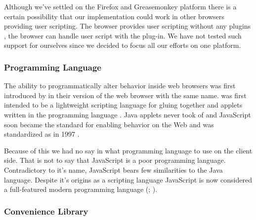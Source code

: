 Although we've settled on the Firefox and Greasemonkey platform there is a
certain possibility that our implementation could work in other browsers
providing user scripting. The  browser provides user scripting
without any plugins%
,
the  browser can handle user script with the
%
plug-in. We have not tested such support for ourselves since we decided to
focus all our efforts on one platform.

\subsubsection{Programming Language}

The ability to programmatically alter behavior inside web browsers was first
introduced by  in their  version of the web browser
with the same name.  was first intended to be a
lightweight scripting language for gluing together  and applets
written in the  programming language \citep{netscape95}. Java
applets never took of and JavaScript soon became the  standard
for enabling behavior on the Web and was standardized as
 in 1997 \citep{ecma99}.

Because of this we had no say in what programming language to use on the
client side. That is not to say that JavaScript is a poor programming
language. Contradictory to it's name, JavaScript bears few similarities to the
Java language.%
Despite it's origins as a scripting language JavaScript is now considered
a full-featured modern programming language
(\citealp[p.~2]{flanagan06};
\citealp[p.~3]{resig06}).


\subsubsection{Convenience Library}

